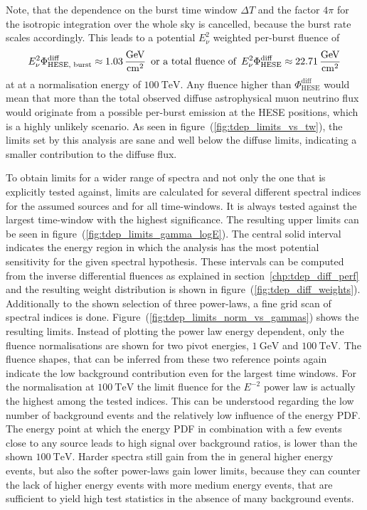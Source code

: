 Note, that the dependence on the burst time window $\Delta T$ and the factor $4\pi$ for the isotropic integration over the whole sky is cancelled, because the burst rate scales accordingly.
This leads to a potential $E_\nu^2$ weighted per-burst fluence of
\begin{equation}
    E_\nu^2\Phi_\text{HESE, burst}^\text{diff}
      \approx \SI{1.03}{\GeV\per\cm\squared}
    \mintertext{or a total fluence of}
    E_\nu^2\Phi_\text{HESE}^\text{diff}
      \approx \SI{22.71}{\GeV\per\cm\squared}
\end{equation}
at at a normalisation energy of $\SI{100}{\TeV}$.
Any fluence higher than $\Phi_\text{HESE}^\text{diff}$ would mean that more than the total observed diffuse astrophysical muon neutrino flux would originate from a possible per-burst emission at the HESE positions, which is a highly unlikely scenario.
As seen in figure~(\ref{fig:tdep_limits_vs_tw}), the limits set by this analysis are sane and well below the diffuse limits, indicating a smaller contribution to the diffuse flux.

To obtain limits for a wider range of spectra and not only the one that is explicitly tested against, limits are calculated for several different spectral indices for the assumed sources and for all time-windows.
It is always tested against the largest time-window with the highest significance.
The resulting upper limits can be seen in figure~(\ref{fig:tdep_limits_gamma_logE}).
The central solid interval indicates the energy region in which the analysis has the most potential sensitivity for the given spectral hypothesis.
These intervals can be computed from the inverse differential fluences as explained in section~\ref{chp:tdep_diff_perf} and the resulting weight distribution is shown in figure~(\ref{fig:tdep_diff_weights}).
Additionally to the shown selection of three power-laws, a fine grid scan of spectral indices is done.
Figure~(\ref{fig:tdep_limits_norm_vs_gammas}) shows the resulting limits.
Instead of plotting the power law energy dependent, only the fluence normalisations are shown for two pivot energies, $\SI{1}{\GeV}$ and $\SI{100}{\TeV}$.
The fluence shapes, that can be inferred from these two reference points again indicate the low background contribution even for the largest time windows.
For the normalisation at $\SI{100}{\TeV}$ the limit fluence for the $E^{-2}$ power law is actually the highest among the tested indices.
This can be understood regarding the low number of background events and the relatively low influence of the energy PDF.
The energy point at which the energy PDF in combination with a few events close to any source leads to high signal over background ratios, is lower than the shown $\SI{100}{\TeV}$.
Harder spectra still gain from the in general higher energy events, but also the softer power-laws gain lower limits, because they can counter the lack of higher energy events with more medium energy events, that are sufficient to yield high test statistics in the absence of many background events.



